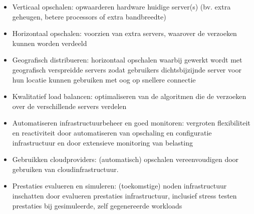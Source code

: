 \begin{itemize}
    \item Verticaal opschalen: opwaarderen hardware huidige server(s)
    (bv. extra geheugen, betere processors of extra bandbreedte)

    \item Horizontaal opschalen: voorzien van extra servers,
    waarover de verzoeken kunnen worden verdeeld

    \item Geografisch distribueren: horizontaal opschalen
    waarbij gewerkt wordt met geografisch verspreidde servers
    zodat gebruikers dichtsbijzijnde server voor hun locatie kunnen gebruiken
    met oog op snellere connectie

    \item Kwalitatief load balancen: optimaliseren van de algoritmen die
    de verzoeken over de verschillende servers verdelen

    \item Automatiseren infrastructuurbeheer en goed monitoren: vergroten
    flexibiliteit en reactiviteit door automatiseren van opschaling en
    configuratie infrastructuur en door extensieve monitoring van belasting
    
    \item Gebruikken cloudproviders: (automatisch) opschalen vereenvoudigen
    door gebruiken van cloudinfrastructuur.

    \item Prestaties evalueren en simuleren: (toekomstige) noden infrastructuur
    inschatten door evalueren prestaties infrastructuur, inclusief
    stress testen prestaties bij gesimuleerde, zelf gegenereerde
    workloads 


\end{itemize}
